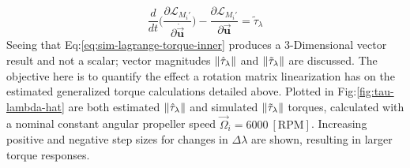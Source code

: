 \begin{equation}\label{eq:sim-lagrange-torque-inner}
\frac{d}{dt}\bigg(\frac{\partial\mathcal{L}_{M_i'}}{\partial\dot{\vec{\mathbf{u}}}}\bigg)-\frac{\partial\mathcal{L}_{M_i'}}{\partial\vec{\mathbf{u}}}=\widetilde{\tau}_\lambda
\end{equation}
Seeing that Eq:\ref{eq:sim-lagrange-torque-inner} produces a 3-Dimensional vector result and not a scalar; vector magnitudes $\left\lVert\hat{\tau}_\lambda\right\rVert$ and $\left\lVert\tilde{\tau}_\lambda\right\rVert$ are discussed. The objective here is to quantify the effect a rotation matrix linearization has on the estimated generalized torque calculations detailed above. Plotted in Fig:\ref{fig:tau-lambda-hat} are both estimated $\left\lVert\hat{\tau}_\lambda\right\rVert$ and simulated $\left\lVert\tilde{\tau}_\lambda\right\rVert$ torques, calculated with a nominal constant angular propeller speed $\vec{\Omega}_i=6000~[\text{RPM}]$. Increasing positive and negative step sizes for changes in $\Delta\lambda$ are shown, resulting in larger torque responses.  
